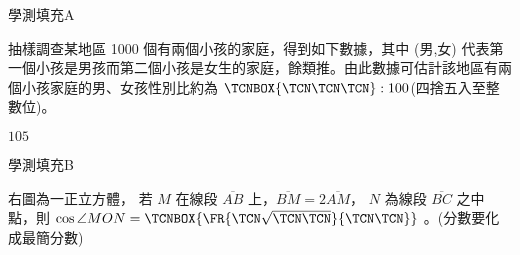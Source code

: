 \begin{QUESTIONS}
    \begin{QUESTION}
        \begin{ExamInfo}{95}{學測}{填充}{A}
        \end{ExamInfo}
        \begin{ExamAnsRateInfo}{44}{80}{44}{8}
        \end{ExamAnsRateInfo}
        \begin{QBODY}
            抽樣調查某地區 1000 個有兩個小孩的家庭，得到如下數據，其中 (男,女) 代表第一個小孩是男孩而第二個小孩是女生的家庭，餘類推。由此數據可估計該地區有兩個小孩家庭的男、女孩性別比約為 $\TCNBOX{\TCN\TCN\TCN}:100 $(四捨五入至整數位)。
        \end{QBODY}
        \begin{QFROMS}
        \end{QFROMS}
        \begin{QTAGS}\end{QTAGS}
        \begin{QANS}
            $105$
        \end{QANS}
        \begin{QSOLLIST}
        \end{QSOLLIST}
        \begin{QEMPTYSPACE}
        \end{QEMPTYSPACE}
    \end{QUESTION}
    \begin{QUESTION}
        \begin{ExamInfo}{95}{學測}{填充}{B}
        \end{ExamInfo}
        \begin{ExamAnsRateInfo}{33}{77}{21}{1}
        \end{ExamAnsRateInfo}
        \begin{QBODY}
            右圖為一正立方體， 若 $M$ 在線段 $\overline{AB}$ 上，$\overline{BM} = 2\overline{AM}$， $N$ 為線段 $\overline{BC}$ 之中點，則 $\cos \angle MON = \TCNBOX{\FR{\TCN\sqrt{\TCN\TCN}}{\TCN\TCN}}$ 。(分數要化成最簡分數)
		

\end{QBODY}
\end{QUESTION}
\end{QUESTIONS}
